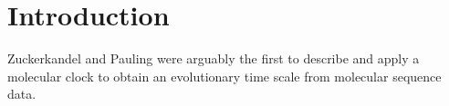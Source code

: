 \section{Introduction} 
Zuckerkandel and Pauling \cite{zuckerkandl1962,zuckerkandl1965} were arguably the first to describe and apply a molecular clock to obtain an evolutionary time scale from molecular sequence data.
  
  